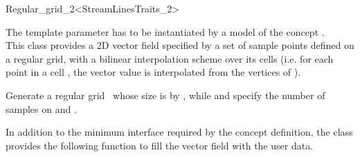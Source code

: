 

\begin{ccRefClass}{Regular_grid_2<StreamLinesTraits_2>}  %

\ccDefinition


The template parameter  has to be
instantiated by a model of the concept .\\
This class provides a 2D vector field specified by a set of sample
points defined on a regular grid, with a bilinear interpolation scheme
over its cells (i.e. for each point  in a cell , the
vector value is interpolated from the vertices of ).

\ccTypes
{}
\ccGlue
{}
\ccGlue
{}

\ccCreation
{}  %

\ccThreeToTwo

\ccThreeToTwo
{}
{Generate a regular grid \ccVar\ whose size is  by , while  and
	 specify the number of samples on  and .}


In addition to the minimum interface required by the concept
definition, the class \ccRefName{} provides the following function to
fill the vector field with the user data.


\end{ccRefClass}
